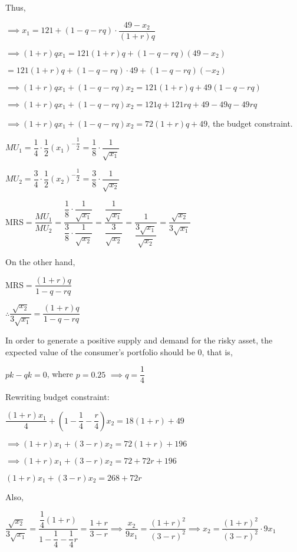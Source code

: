 \documentclass{article}
\begin{document}
Thus,

$\implies x_{1}=121+\left(1-q-rq\right)\cdot\dfrac{49-x_{2}}{\left(1+r\right)q}$

$\implies \left(1+r\right)qx_{1}=121\left(1+r\right)q+\left(1-q-rq\right)\left(49-x_{2}\right)$

$=121\left(1+r\right)q+\left(1-q-rq\right)\cdot49+\left(1-q-rq\right)\left(-x_{2}\right)$

$\implies \left(1+r\right)qx_{1}+\left(1-q-rq\right)x_{2}=121\left(1+r\right)q+49\left(1-q-rq\right)$

$\implies \left(1+r\right)qx_{1}+\left(1-q-rq\right)x_{2}=121q+121rq+49-49q-49rq$

$\implies \left(1+r\right)qx_{1}+\left(1-q-rq\right)x_{2}=72\left(1+r\right)q+49$, the budget constraint.

$MU_{1}=\dfrac{1}{4}\cdot\dfrac{1}{2}\left(x_{1}\right)^{-\dfrac{1}{2}}=\dfrac{1}{8}\cdot\dfrac{1}{\sqrt{x_{1}}}$

$MU_{2}=\dfrac{3}{4}\cdot\dfrac{1}{2}\left(x_{2}\right)^{-\dfrac{1}{2}}=\dfrac{3}{8}\cdot\dfrac{1}{\sqrt{x_{2}}}$

MRS$=\dfrac{MU_{1}}{MU_{2}}=\dfrac{\dfrac{1}{8}\cdot\dfrac{1}{\sqrt{x_{1}}}}{\dfrac{3}{8}\cdot\dfrac{1}{\sqrt{x_{2}}}}=\dfrac{\dfrac{1}{\sqrt{x_{1}}}}{\dfrac{3}{\sqrt{x_{2}}}}=\dfrac{1}{\dfrac{3\sqrt{x_{1}}}{\sqrt{x_{2}}}}=\dfrac{\sqrt{x_{2}}}{3\sqrt{x_{1}}}$

On the other hand,

MRS$=\dfrac{\left(1+r\right)q}{1-q-rq}$

$\therefore\dfrac{\sqrt{x_{2}}}{3\sqrt{x_{1}}}=\dfrac{\left(1+r\right)q}{1-q-rq}$

In order to generate a positive supply and demand for the risky asset, the expected value of the consumer's portfolio should be 0, that is,

$pk-qk=0$, where $p=0.25$ $\implies \boxed{q=\dfrac{1}{4}}$

Rewriting budget constraint:

$\dfrac{\left(1+r\right)x_{1}}{4}+\left(1-\dfrac{1}{4}-\dfrac{r}{4}\right)x_{2}=18\left(1+r\right)+49$

$\implies \left(1+r\right)x_{1}+\left(3-r\right)x_{2}=72\left(1+r\right)+196$

$\implies \left(1+r\right)x_{1}+\left(3-r\right)x_{2}=72+72r+196$

$\left(1+r\right)x_{1}+\left(3-r\right)x_{2}=268+72r$

Also,

$\dfrac{\sqrt{x_{2}}}{3\sqrt{x_{1}}}=\dfrac{\dfrac{1}{4}\left(1+r\right)}{1-\dfrac{1}{4}-\dfrac{1}{4}r}=\dfrac{1+r}{3-r}\implies\dfrac{x_{2}}{9x_{1}}=\dfrac{\left(1+r\right)^{2}}{\left(3-r\right)^{2}}\implies x_{2}=\dfrac{\left(1+r\right)^{2}}{\left(3-r\right)^{2}}\cdot9x_{1}$
\end{document}
